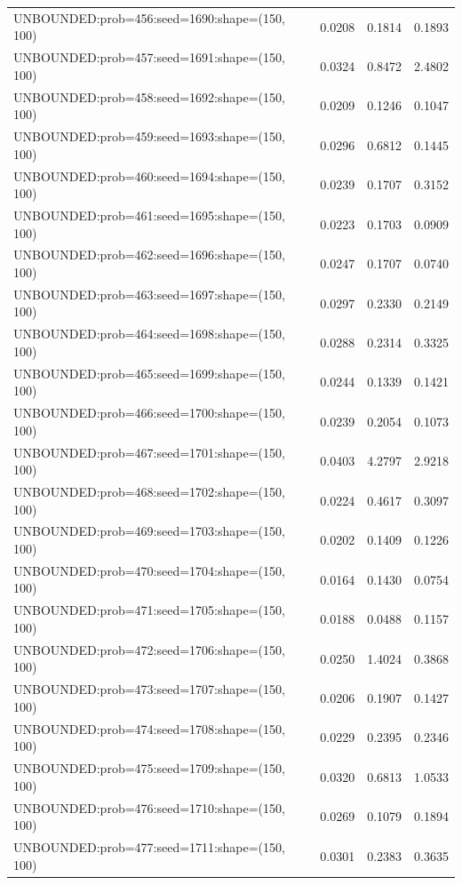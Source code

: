 \begin{longtable}{lccc}
UNBOUNDED:prob=456:seed=1690:shape=(150, 100) &   0.0208 &  0.1814 &  0.1893 \\
UNBOUNDED:prob=457:seed=1691:shape=(150, 100) &   0.0324 &  0.8472 &  2.4802 \\
UNBOUNDED:prob=458:seed=1692:shape=(150, 100) &   0.0209 &  0.1246 &  0.1047 \\
UNBOUNDED:prob=459:seed=1693:shape=(150, 100) &   0.0296 &  0.6812 &  0.1445 \\
UNBOUNDED:prob=460:seed=1694:shape=(150, 100) &   0.0239 &  0.1707 &  0.3152 \\
UNBOUNDED:prob=461:seed=1695:shape=(150, 100) &   0.0223 &  0.1703 &  0.0909 \\
UNBOUNDED:prob=462:seed=1696:shape=(150, 100) &   0.0247 &  0.1707 &  0.0740 \\
UNBOUNDED:prob=463:seed=1697:shape=(150, 100) &   0.0297 &  0.2330 &  0.2149 \\
UNBOUNDED:prob=464:seed=1698:shape=(150, 100) &   0.0288 &  0.2314 &  0.3325 \\
UNBOUNDED:prob=465:seed=1699:shape=(150, 100) &   0.0244 &  0.1339 &  0.1421 \\
UNBOUNDED:prob=466:seed=1700:shape=(150, 100) &   0.0239 &  0.2054 &  0.1073 \\
UNBOUNDED:prob=467:seed=1701:shape=(150, 100) &   0.0403 &  4.2797 &  2.9218 \\
UNBOUNDED:prob=468:seed=1702:shape=(150, 100) &   0.0224 &  0.4617 &  0.3097 \\
UNBOUNDED:prob=469:seed=1703:shape=(150, 100) &   0.0202 &  0.1409 &  0.1226 \\
UNBOUNDED:prob=470:seed=1704:shape=(150, 100) &   0.0164 &  0.1430 &  0.0754 \\
UNBOUNDED:prob=471:seed=1705:shape=(150, 100) &   0.0188 &  0.0488 &  0.1157 \\
UNBOUNDED:prob=472:seed=1706:shape=(150, 100) &   0.0250 &  1.4024 &  0.3868 \\
UNBOUNDED:prob=473:seed=1707:shape=(150, 100) &   0.0206 &  0.1907 &  0.1427 \\
UNBOUNDED:prob=474:seed=1708:shape=(150, 100) &   0.0229 &  0.2395 &  0.2346 \\
UNBOUNDED:prob=475:seed=1709:shape=(150, 100) &   0.0320 &  0.6813 &  1.0533 \\
UNBOUNDED:prob=476:seed=1710:shape=(150, 100) &   0.0269 &  0.1079 &  0.1894 \\
UNBOUNDED:prob=477:seed=1711:shape=(150, 100) &   0.0301 &  0.2383 &  0.3635 \\

\end{longtable}

